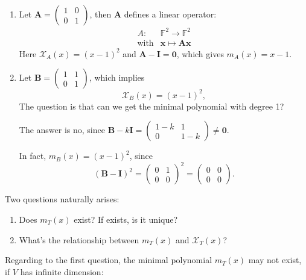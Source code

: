 \begin{example}
\begin{enumerate}
\item
Let $\bm A=\begin{pmatrix}
1&0\\0&1
\end{pmatrix}$, then $\bm A$ defines a linear operator:
\[
\begin{array}{ll}
A:&\mathbb{F}^2\to\mathbb{F}^2\\
\text{with}&\bm x\mapsto\bm A\bm x
\end{array}
\]
Here $\mathcal{X}_{ A}(x) = (x-1)^2$ and $\bm A-\bm I=\bm0$, which gives $m_A(x)=x-1$.
\item
Let $\bm B=\begin{pmatrix}
1&1\\0&1
\end{pmatrix}$, which implies
\[
\mathcal{X}_{ B}(x)=(x-1)^2,
\]
The question is that can we get the minimal polynomial with degree 1?

The answer is no, since $\bm B-k\bm I=\begin{pmatrix}
1-k&1\\0&1-k
\end{pmatrix}\ne\bm0$.

In fact, $m_B(x) = (x-1)^2$, since
\[
(\bm B-\bm I)^2=\begin{pmatrix}
0&1\\0&0
\end{pmatrix}^2=\begin{pmatrix}
0&0\\0&0
\end{pmatrix}.
\]
\end{enumerate}
\end{example}
%
Two questions naturally arises:
\begin{enumerate}
\item
Does $m_T(x)$ exist? If exists, is it unique?
\item
What's the relationship between  $m_T(x)$ and $\mathcal{X}_T(x)$?
\end{enumerate}
Regarding to the first question, the minimal polynomial $m_T(x)$ may not exist, if $V$ has infinite dimension:
